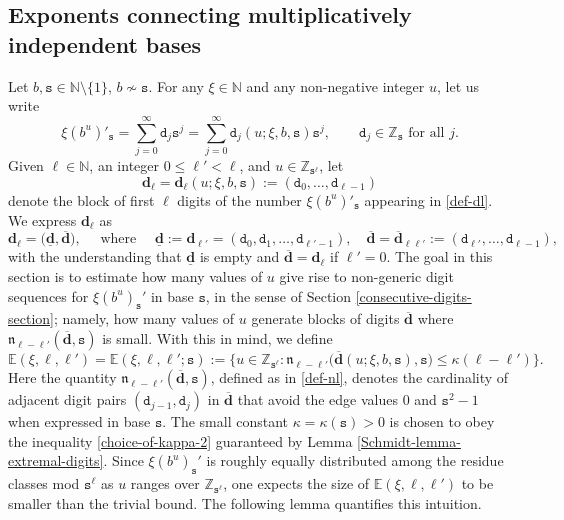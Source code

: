 \documentclass[12pt, twoside]{article}
\theoremstyle{definition}
\numberwithin{equation}{section}
\begin{document}
\subsection{Exponents connecting multiplicatively independent bases} 
Let $b, \mathtt s \in \mathbb N \setminus \{1\}$, $b \nsim \mathtt s$. For any $\xi \in \mathbb N$ and any non-negative integer $u$, let us write 
\begin{equation} \label{def-dl} 
\xi (b^u)'_{\mathtt s} = \sum_{j=0}^{\infty} \mathtt d_j \mathtt s^j = \sum_{j=0}^{\infty} \mathtt d_j(u; \xi, b, \mathtt s) \mathtt s^j , \qquad \mathtt d_j \in \mathbb Z_{\mathtt s} \text{ for all $j$.}
\end{equation}  
Given $\ell \in \mathbb N$, an integer $0 \leq \ell' < \ell$, and $u \in \mathbb Z_{\mathtt s^{\ell}}$, let 
\begin{equation} \label{dell} 
 \mathbf d_{\ell}= \mathbf d_{\ell}(u; \xi, b, \mathtt s) := (\mathtt d_0, \ldots, \mathtt d_{\ell-1}) 
 \end{equation} denote the block of first $\ell$ digits of the number $\xi (b^u)'_{\mathtt s}$ appearing in \eqref{def-dl}. We express $\mathbf d_{\ell}$ as 
\begin{equation} 
\mathbf d_{\ell} = \bigl(\underline{\mathbf d}, \overline{\mathbf d} \bigr), \quad \text{ where } \quad \underline{\mathbf d} := {\mathbf d}_{\ell'} = (\mathtt d_0, \mathtt d_1, \ldots, \mathtt d_{\ell'-1}), \quad \overline{\mathbf d} = \overline{\mathbf d}_{\ell \ell'} := (\mathtt d_{\ell'}, \ldots, \mathtt d_{\ell-1}),
\end{equation}
with the understanding that $\underline{\mathbf d}$ is empty and $\overline{\mathbf d} = \mathbf d_{\ell}$ if $\ell' = 0$. 
\vskip0.1in
\noindent The goal in this section is to estimate how many values of $u$ give rise to non-generic digit sequences for $\xi (b^u)_{\mathtt s}'$ in base $\mathtt s$, in the sense of Section \ref{consecutive-digits-section}; namely, how many values of $u$ generate blocks of digits $\overline{\mathbf d}$ where $\mathfrak n_{\ell-\ell'}(\overline{\mathbf d}, \mathtt s)$ is small. With this in mind, we define   
\begin{equation} \label{def-Ell'}
\mathbb E(\xi, \ell, \ell') = \mathbb E(\xi, \ell, \ell'; \mathtt s)  := \bigl\{u \in \mathbb Z_{\mathtt s^{\ell}} : \mathfrak n_{\ell - \ell'}\bigl(\overline{\mathbf d}(u; \xi,  b, \mathtt s), \mathtt s \bigr) \leq \kappa (\ell - \ell') \bigr\}.
\end{equation} 
Here the quantity $\mathfrak n_{\ell - \ell'}(\overline{\mathbf d}, \mathtt s)$, defined as in \eqref{def-nl}, denotes the cardinality of adjacent digit pairs $(\mathtt d_{j-1}, \mathtt d_j)$ in $\overline{\mathbf d}$ that avoid the edge values 0 and $\mathtt s^2-1$ when expressed in base $\mathtt s$. The small constant $\kappa = \kappa(\mathtt s) >0$ is chosen to obey the inequality \eqref{choice-of-kappa-2} guaranteed by Lemma \ref{Schmidt-lemma-extremal-digits}. Since $\xi (b^u)_{\mathtt s}'$ is roughly equally distributed among the residue classes mod $\mathtt s^{\ell}$ as $u$ ranges over $\mathbb Z_{\mathtt s^{\ell}}$, one expects the size of  $\mathbb E(\xi, \ell, \ell')$ to be smaller than the trivial bound. The following lemma quantifies this intuition. 
\end{document}

